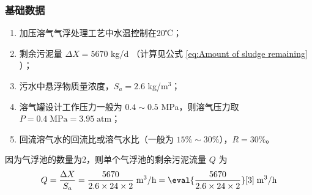 \subsubsection{基础数据}
\begin{enumerate}
	\item 加压溶气气浮处理工艺中水温控制在20℃；
	\item 剩余污泥量 $\Delta X=5670$ kg/d （计算见公式 \ref{eq:Amount of sludge remaining} ）；
	\item 污水中悬浮物质量浓度，$S_a=2.6$ kg/m$^3$；
	\item 溶气罐设计工作压力一般为 $0.4\sim0.5$ MPa\cite{HJ2007-2010}，则溶气压力取 $P=0.4 \;\text{MPa}=3.95 \;\text{atm}$；
	\item 回流溶气水的回流比或溶气水比（一般为 $15\%\sim30\%$\cite{HJ2007-2010}），$R =30 \%$。
\end{enumerate}
因为气浮池的数量为2，则单个气浮池的剩余污泥流量 $Q$ 为
\begin{align}
	Q=\dfrac{\Delta X}{S_a}=\dfrac{5670}{2.6 \times 24 \times 2} \;\text{m$^3$/h} = \eval{\dfrac{5670}{2.6 \times 24 \times 2}}[3] \;\text{m$^3$/h}
\end{align}



